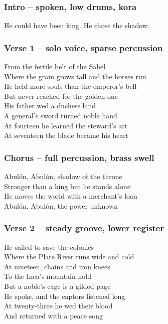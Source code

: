 \subsubsection{Intro -- spoken, low drums,
kora}\label{intro-spoken-low-drums-kora}

He could have been king. He chose the shadow.

\subsubsection{Verse 1 -- solo voice, sparse
percussion}\label{verse-1-solo-voice-sparse-percussion}

From the fertile belt of the Sahel\\
Where the grain grows tall and the horses run\\
He held more souls than the emperor's bell\\
But never reached for the golden one\\
His father wed a duchess land\\
A general's sword turned noble hand\\
At fourteen he learned the steward's art\\
At seventeen the blade became his heart

\subsubsection{Chorus -- full percussion, brass
swell}\label{chorus-full-percussion-brass-swell}

Abulón, Abulón, shadow of the throne\\
Stronger than a king but he stands alone\\
He moves the world with a merchant's loan\\
Abulón, Abulón, the power unknown

\subsubsection{Verse 2 -- steady groove, lower
register}\label{verse-2-steady-groove-lower-register}

He sailed to save the colonies\\
Where the Plate River runs wide and cold\\
At nineteen, chains and iron knees\\
To the Inca's mountain hold\\
But a noble's cage is a gilded page\\
He spoke, and the captors listened long\\
At twenty-three he wed their blood\\
And returned with a peace song

